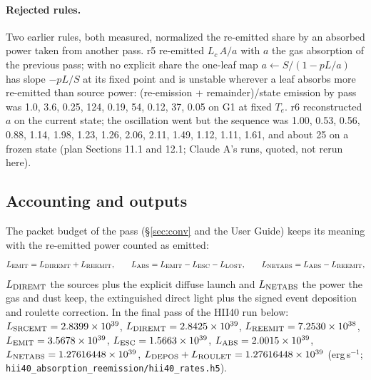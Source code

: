 \documentclass[english,a4paper]{my_memo}
\newcommand{\code}[1]{\texttt{#1}}
\begin{document}
\paragraph{Rejected rules.}  Two earlier rules, both measured, normalized
the re-emitted share by an absorbed power taken from another pass.  r5
re-emitted $L_c\,A/a$ with $a$ the gas absorption of the previous pass; with
no explicit share the one-leaf map $a\leftarrow S/(1-pL/a)$ has slope $-pL/S$
at its fixed point and is unstable wherever a leaf absorbs more re-emitted
than source power: (re-emission + remainder)/state emission by pass was 1.0,
3.6, 0.25, 124, 0.19, 54, 0.12, 37, 0.05 on G1 at fixed $T_e$.  r6
reconstructed $a$ on the current state; the oscillation went but the sequence
was 1.00, 0.53, 0.56, 0.88, 1.14, 1.98, 1.23, 1.26, 2.06, 2.11, 1.49, 1.12,
1.11, 1.61, and about 25 on a frozen state (plan Sections 11.1 and 12.1;
Claude A's runs, quoted, not rerun here).

\subsection{Accounting and outputs}
\label{sec:reem-accounting}
The packet budget of the pass (\S\ref{sec:conv} and the User Guide) keeps its
meaning with the re-emitted power counted as emitted:
\begin{equation}
 L_{\rm EMIT} = L_{\rm DIREMT} + L_{\rm REEMIT},\qquad
 L_{\rm ABS} = L_{\rm EMIT}-L_{\rm ESC}-L_{\rm LOST},\qquad
 L_{\rm NETABS} = L_{\rm ABS}-L_{\rm REEMIT},
 \label{eq:reem-budget}
\end{equation}
$L_{\rm DIREMT}$ the sources plus the explicit diffuse launch and
$L_{\rm NETABS}$ the power the gas and dust keep, the extinguished direct
light plus the signed event deposition and roulette correction.  In the final
pass of the HII40 run below: $L_{\rm SRCEMT}=2.8399\times10^{39}$,
$L_{\rm DIREMT}=2.8425\times10^{39}$, $L_{\rm REEMIT}=7.2530\times10^{38}$,
$L_{\rm EMIT}=3.5678\times10^{39}$, $L_{\rm ESC}=1.5663\times10^{39}$,
$L_{\rm ABS}=2.0015\times10^{39}$, $L_{\rm NETABS}=1.27616448\times10^{39}$,
$L_{\rm DEPOS}+L_{\rm ROULET}=1.27616448\times10^{39}$ (erg\,s$^{-1}$;
\code{hii40\_absorption\_reemission/hii40\_rates.h5}).
\end{document}
